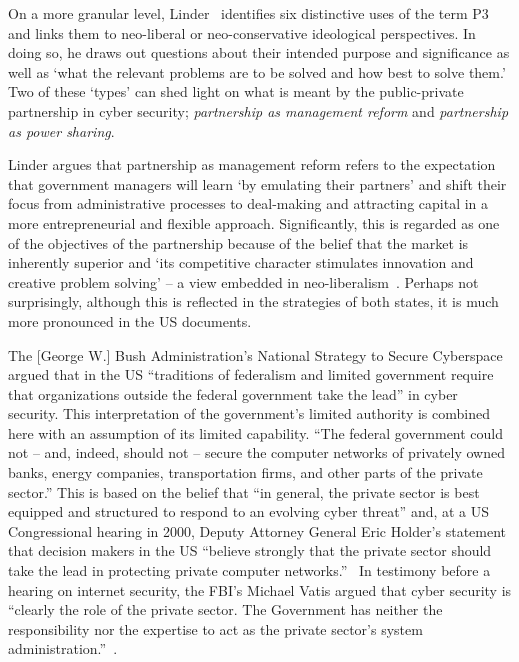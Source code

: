 \documentclass[a4paper,11pt]{article}
\begin{document}
On a more granular level, Linder~\cite{linder:1999} identifies six
distinctive uses of the term P3 and links them to neo-liberal or
neo-conservative ideological perspectives. In doing so, he draws out
questions about their intended purpose and significance as well as
`what the relevant problems are to be solved and how best to solve
them.'  Two of these `types' can shed light on what is meant by the
public-private partnership in cyber security; {\emph{partnership as
management reform}} and {\emph{partnership as power sharing}}.

Linder argues that partnership as management reform refers to the
expectation that government managers will learn `by emulating their
partners' and shift their focus from administrative processes to
deal-making and attracting capital in a more entrepreneurial and
flexible approach. Significantly, this is regarded as one of the
objectives of the partnership because of the belief that the market is
inherently superior and `its competitive character stimulates
innovation and creative problem solving' -- a view embedded in
neo-liberalism~\cite{linder:1999}. Perhaps not surprisingly, although
this is reflected in the strategies of both states, it is much more
pronounced in the US documents.

The [George W.] Bush Administration’s National Strategy to Secure
Cyberspace~\cite{gwbush:2003} argued that in the US ``traditions of
federalism and limited government require that organizations outside
the federal government take the lead'' in cyber security.  This
interpretation of the government's limited authority is combined here
with an assumption of its limited capability. ``The federal government
could not -- and, indeed, should not -- secure the computer networks
of privately owned banks, energy companies, transportation firms, and
other parts of the private sector.''  This is based on the belief that
``in general, the private sector is best equipped and structured to
respond to an evolving cyber threat'' and, at a US Congressional
hearing in 2000, Deputy Attorney General Eric Holder’s statement that
decision makers in the US ``believe strongly that the private sector
should take the lead in protecting private computer
networks.''~\cite{holder:2000} In testimony before a hearing on
internet security, the FBI’s Michael Vatis argued that cyber security
is ``clearly the role of the private sector. The Government has
neither the responsibility nor the expertise to act as the private
sector’s system administration.''~\cite{vatis:2000}.
\end{document}
